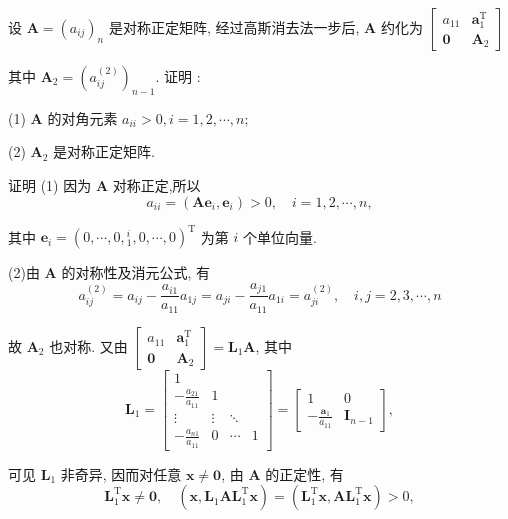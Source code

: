   \begin{tcolorbox}[enhanced,colback=10,colframe=9,breakable,coltitle=green!25!black,title=2024]
  
设 $ \boldsymbol{A}=\left(a_{i j}\right)_{n} $ 是对称正定矩阵, 经过高斯消去法一步后, $ \boldsymbol{A} $ 约化为
$
\left[\begin{array}{cc}
a_{11} & \boldsymbol{a}_{1}^{\mathrm{T}} \\
\mathbf{0} & \boldsymbol{A}_{2}
\end{array}\right]
$

其中 $ \boldsymbol{A}_{2}=\left(a_{i j}^{(2)}\right)_{n-1} $. 证明 :

(1) $ \boldsymbol{A} $ 的对角元素 $ a_{i i}>0, i=1,2, \cdots, n $;

(2) $ \boldsymbol{A}_{2} $ 是对称正定矩阵.
\tcblower

证明 (1) 因为 $ \boldsymbol{A} $ 对称正定,所以
$$
a_{i i}=\left(\boldsymbol{A} \boldsymbol{e}_{i}, \boldsymbol{e}_{i}\right)>0, \quad i=1,2, \cdots, n,
$$

其中 $ \boldsymbol{e}_{i}=\left(0, \cdots, 0,{ }_{1}^{i}, 0, \cdots, 0\right)^{\mathrm{T}} $ 为第 $ i $ 个单位向量.

(2)由 $ \boldsymbol{A} $ 的对称性及消元公式, 有
$$
a_{i j}^{(2)}=a_{i j}-\frac{a_{i 1}}{a_{11}} a_{1 j}=a_{j i}-\frac{a_{j 1}}{a_{11}} a_{1 i}=a_{j i}^{(2)}, \quad i, j=2,3, \cdots, n
$$

故 $ \boldsymbol{A}_{2} $ 也对称.
又由 $ \left[\begin{array}{cc}a_{11} & \boldsymbol{a}_{1}^{\mathrm{T}} \\ \mathbf{0} & \boldsymbol{A}_{2}\end{array}\right]=\boldsymbol{L}_{1} \boldsymbol{A} $, 其中
$$
\boldsymbol{L}_{1}=\left[\begin{array}{cccc}
1 & & & \\
-\frac{a_{21}}{a_{11}} & 1 & & \\
\vdots & \vdots & \ddots & \\
-\frac{a_{n 1}}{a_{11}} & 0 & \cdots & 1
\end{array}\right]=\left[\begin{array}{cc}
1 & 0 \\
-\frac{\boldsymbol{a}_{1}}{a_{11}} & \boldsymbol{I}_{n-1}
\end{array}\right],
$$

可见 $ \boldsymbol{L}_{1} $ 非奇异, 因而对任意 $ \boldsymbol{x} \neq \mathbf{0} $, 由 $ \boldsymbol{A} $ 的正定性, 有
$$
\boldsymbol{L}_{1}^{\mathrm{T}} \boldsymbol{x} \neq \mathbf{0}, \quad\left(\boldsymbol{x}, \boldsymbol{L}_{1} \boldsymbol{A} \boldsymbol{L}_{1}^{\mathrm{T}} \boldsymbol{x}\right)=\left(\boldsymbol{L}_{1}^{\mathrm{T}} \boldsymbol{x}, \boldsymbol{A} \boldsymbol{L}_{1}^{\mathrm{T}} \boldsymbol{x}\right)>0,
$$


\end{tcolorbox}
